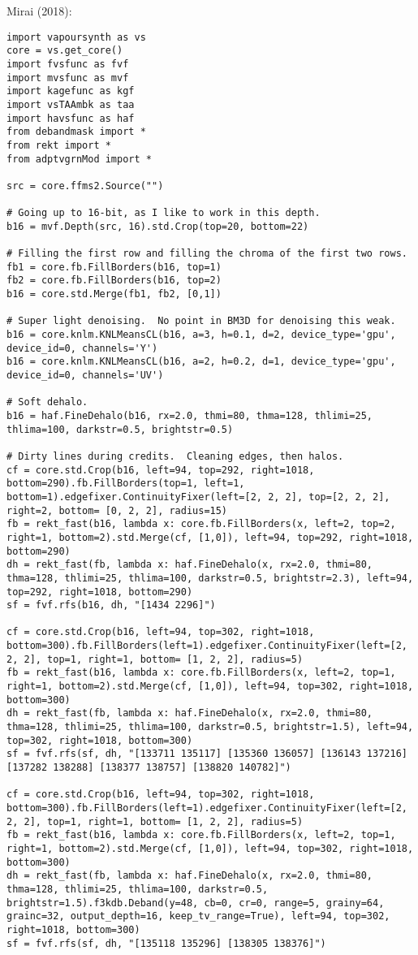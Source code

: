 \documentclass{scrartcl}
\begin{document}
Mirai (2018):
\begin{lstlisting}
import vapoursynth as vs
core = vs.get_core()
import fvsfunc as fvf
import mvsfunc as mvf
import kagefunc as kgf
import vsTAAmbk as taa
import havsfunc as haf
from debandmask import *
from rekt import *
from adptvgrnMod import *

src = core.ffms2.Source("")

# Going up to 16-bit, as I like to work in this depth.
b16 = mvf.Depth(src, 16).std.Crop(top=20, bottom=22)

# Filling the first row and filling the chroma of the first two rows.
fb1 = core.fb.FillBorders(b16, top=1)
fb2 = core.fb.FillBorders(b16, top=2)
b16 = core.std.Merge(fb1, fb2, [0,1])

# Super light denoising.  No point in BM3D for denoising this weak.
b16 = core.knlm.KNLMeansCL(b16, a=3, h=0.1, d=2, device_type='gpu', device_id=0, channels='Y')
b16 = core.knlm.KNLMeansCL(b16, a=2, h=0.2, d=1, device_type='gpu', device_id=0, channels='UV')

# Soft dehalo. 
b16 = haf.FineDehalo(b16, rx=2.0, thmi=80, thma=128, thlimi=25, thlima=100, darkstr=0.5, brightstr=0.5)

# Dirty lines during credits.  Cleaning edges, then halos.
cf = core.std.Crop(b16, left=94, top=292, right=1018, bottom=290).fb.FillBorders(top=1, left=1, bottom=1).edgefixer.ContinuityFixer(left=[2, 2, 2], top=[2, 2, 2], right=2, bottom= [0, 2, 2], radius=15)
fb = rekt_fast(b16, lambda x: core.fb.FillBorders(x, left=2, top=2, right=1, bottom=2).std.Merge(cf, [1,0]), left=94, top=292, right=1018, bottom=290)
dh = rekt_fast(fb, lambda x: haf.FineDehalo(x, rx=2.0, thmi=80, thma=128, thlimi=25, thlima=100, darkstr=0.5, brightstr=2.3), left=94, top=292, right=1018, bottom=290)
sf = fvf.rfs(b16, dh, "[1434 2296]")

cf = core.std.Crop(b16, left=94, top=302, right=1018, bottom=300).fb.FillBorders(left=1).edgefixer.ContinuityFixer(left=[2, 2, 2], top=1, right=1, bottom= [1, 2, 2], radius=5)
fb = rekt_fast(b16, lambda x: core.fb.FillBorders(x, left=2, top=1, right=1, bottom=2).std.Merge(cf, [1,0]), left=94, top=302, right=1018, bottom=300)
dh = rekt_fast(fb, lambda x: haf.FineDehalo(x, rx=2.0, thmi=80, thma=128, thlimi=25, thlima=100, darkstr=0.5, brightstr=1.5), left=94, top=302, right=1018, bottom=300)
sf = fvf.rfs(sf, dh, "[133711 135117] [135360 136057] [136143 137216] [137282 138288] [138377 138757] [138820 140782]")

cf = core.std.Crop(b16, left=94, top=302, right=1018, bottom=300).fb.FillBorders(left=1).edgefixer.ContinuityFixer(left=[2, 2, 2], top=1, right=1, bottom= [1, 2, 2], radius=5)
fb = rekt_fast(b16, lambda x: core.fb.FillBorders(x, left=2, top=1, right=1, bottom=2).std.Merge(cf, [1,0]), left=94, top=302, right=1018, bottom=300)
dh = rekt_fast(fb, lambda x: haf.FineDehalo(x, rx=2.0, thmi=80, thma=128, thlimi=25, thlima=100, darkstr=0.5, brightstr=1.5).f3kdb.Deband(y=48, cb=0, cr=0, range=5, grainy=64, grainc=32, output_depth=16, keep_tv_range=True), left=94, top=302, right=1018, bottom=300)
sf = fvf.rfs(sf, dh, "[135118 135296] [138305 138376]")


\end{lstlisting}
\end{document}
